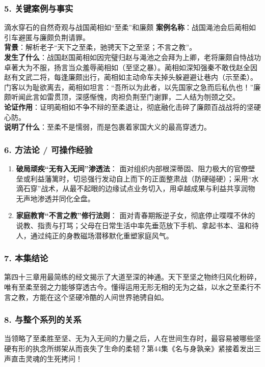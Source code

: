 \subsubsection{5. 关键案例与事实}
\begin{CaseBox}{滴水穿石的自然奇观与战国蔺相如“至柔”和廉颇}
\textbf{案例名称}：战国渑池会后蔺相如引车避匿与廉颇负荆请罪。\\
\textbf{背景}：解析老子“天下之至柔，驰骋天下之至坚；不言之教”。\\
\textbf{发生了什么}：战国赵国蔺相如因完璧归赵与渑池之会拜为上卿，老将廉颇自恃战功卓著大为不服，扬言当众羞辱蔺相如（至坚之暴）。蔺相如深知强秦不敢伐赵全因赵有文武二将，每逢廉颇出行，蔺相如主动命车夫掉头躲避避让巷内（示至柔）。门客以为耻欲离去，蔺相如坦言：“吾所以为此者，以先国家之急而后私仇也！”廉颇听闻此言如雷贯顶，深感惭愧，肉袒负荆至门谢罪，二人结为刎颈之交。\\
\textbf{论证作用}：证明蔺相如不争不辩的至柔退让，彻底融化击碎了廉颇百战战将的坚硬心防。\\
\textbf{说明了什么}：至柔不是懦弱，而是包裹着家国大义的最高穿透力。
\end{CaseBox}

\subsubsection{6. 方法论 / 可操作经验}
\begin{enumerate}
    \item \textbf{破局顽疾“无有入无间”渗透法}：
    面对组织内部根深蒂固、阻力极大的官僚壁垒或利益藩篱时，切忌强行发动自上而下的正面整肃战（防硬碰硬）；采用“水滴石穿”战术，从最不起眼的边缘试点业务切入，用卓越成果与利益共享润物无声地渗透并同化全盘。
    \item \textbf{家庭教育“不言之教”修行法则}：
    面对青春期叛逆子女，彻底停止喋喋不休的说教、指责与打骂；父母在日常生活中率先垂范放下手机、拿起书本、温和待人，通过纯正的身教磁场潜移默化重塑家庭风气。
    \end{enumerate}

\subsubsection{7. 本集结论}
第四十三章用最简练的经文揭示了大道至深的神通。天下至坚之物终归风化粉碎，唯有至柔至弱之力能够穿透古今。懂得运用无形无相的无为之益，以水之至柔行不言之教，方能在这个坚硬冷酷的人间世界驰骋自如。

\subsubsection{8. 与整个系列的关系}
当领略了至柔胜至坚、无为入无间的力量之后，人在世间生存时，最容易被哪些坚硬有形的执念所绑架从而丧失了生命的柔韧？第44集《名与身孰亲》紧接着发出三声直击灵魂的生死拷问！


